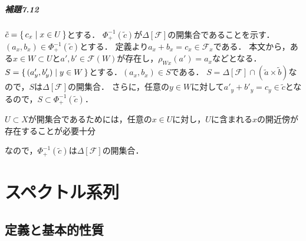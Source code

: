 \paragraph{補題7.12}
$\tilde{c} = \set{c_x | x\in U}$とする．
$\varPhi_+^{-1}(\tilde{c})$が$\varDelta[\mathscr{F}]$の開集合であることを示す．
$(a_x, b_x) \in \varPhi_+^{-1}(\tilde{c})$とする．
定義より$a_x + b_x = c_x \in \mathscr{F}_x$である．
本文から，ある$x \in W \subset U$と$a', b'\in \mathscr{F}(W)$が存在し，$\rho_{Wx}(a')=a_x$などとなる．
$S = \set{(a'_y, b'_y) | y \in W}$とする．$(a_x, b_x) \in S$である．
$S = \varDelta[\mathscr{F}] \cap (\tilde{a} \times \tilde{b})$なので，$S$は$\varDelta[\mathscr{F}]$の開集合．
さらに，任意の$y \in W$に対して$a'_y + b'_y = c_y \in \tilde{c}$となるので，$S \subset \varPhi_+^{-1}(\tilde{c})$．
\begin{screen}
  $U \subset X$が開集合であるためには，任意の$x\in U$に対し，$U$に含まれる$x$の開近傍が存在することが必要十分
\end{screen}
なので，$\varPhi_+^{-1}(\tilde{c})$は$\varDelta[\mathscr{F}]$の開集合．

\chapter{スペクトル系列}
\section{定義と基本的性質}
